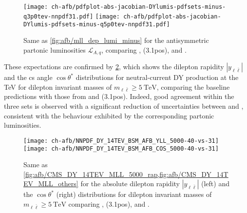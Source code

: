 \begin{figure}[!t]
 \centering
 \texttt{[image: ch-afb/pdfplot-abs-jacobian-DYlumis-pdfsets-minus-q3p0tev-nnpdf31.pdf]}
 \texttt{[image: ch-afb/pdfplot-abs-jacobian-DYlumis-pdfsets-minus-q5p0tev-nnpdf31.pdf]}
 \caption{Same as \cref{fig:afb/mll_dep_lumi_minus} for the antisymmetric partonic luminosities $\mathcal{L}_{A,q}$,
   comparing , (3.1pos), and .
 }    
 \label{fig:afb/pdfplot-absDYlumis-pdfsets-minus-q5tev-nnpdf31}
\end{figure}

These expectations are confirmed by
\cref{fig:afb/CMS_DY_14TEV_COSTH_5000_YLL40-vs-31}, which shows the
dilepton rapidity $|y_{\ell\bar{\ell}}|$ 
and the \acrlong{cs} angle $\cos\theta^*$ distributions for neutral-current DY production
at the  TeV for dilepton invariant masses of $m_{\ell\bar{\ell}}\ge \SI{5}{\tera\electronvolt}$,
comparing the baseline  predictions with those from 
and (3.1pos).
%
Indeed, 
good agreement within the three \pdf sets is observed with a significant reduction
of \pdf uncertainties between  and , consistent
with the behaviour exhibited by the corresponding partonic luminosities.

\begin{figure}[!t]
 \centering
 \texttt{[image: ch-afb/NNPDF\_DY\_14TEV\_BSM\_AFB\_YLL\_5000-40-vs-31]}
 \texttt{[image: ch-afb/NNPDF\_DY\_14TEV\_BSM\_AFB\_COS\_5000-40-vs-31]}
 \caption{
   Same as
   \cref{fig:afb/CMS_DY_14TEV_MLL_5000_rap,fig:afb/CMS_DY_14TEV_MLL_others} for
   the absolute dilepton rapidity $|y_{\ell\bar{\ell}}|$ (left) and the $\cos
   \theta^*$ (right) distributions for dilepton invariant masses of
   $m_{\ell\bar{\ell}}\ge \SI{5}{\tera\electronvolt}$ comparing ,
   (3.1pos), and .
 }    
 \label{fig:afb/CMS_DY_14TEV_COSTH_5000_YLL40-vs-31}
\end{figure}
